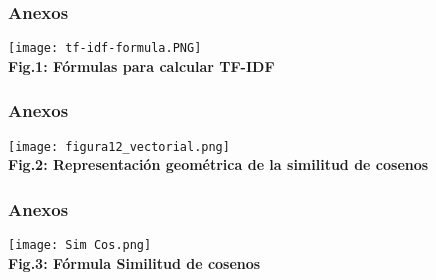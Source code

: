 \documentclass{beamer}
\begin{document}
\begin{frame}
    \frametitle{Anexos}
    \begin{center}
    \texttt{[image: tf-idf-formula.PNG]}\\
    \textbf{Fig.1: Fórmulas para calcular TF-IDF}
    \end{center}
\end{frame}
\begin{frame}
    \frametitle{Anexos}
    \begin{center}
    \texttt{[image: figura12\_vectorial.png]}\\
    \textbf{Fig.2: Representación geométrica de la similitud de cosenos}
    \end{center}
\end{frame}
\begin{frame}
    \frametitle{Anexos}
    \begin{center}
    \texttt{[image: Sim Cos.png]}\\
    \textbf{Fig.3: Fórmula Similitud de cosenos}
    \end{center}
\end{frame}
    
\end{document}
